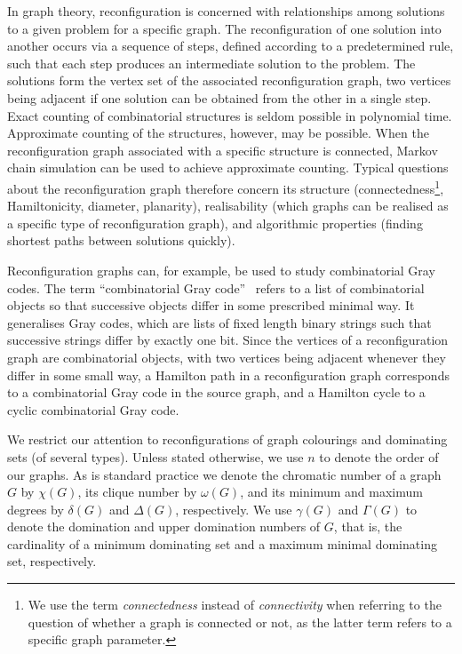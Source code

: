 \documentclass[12pt]{article}%
\begin{document}
\label{26CM-Sec_Intro} In graph theory, reconfiguration is concerned with
relationships among solutions to a given problem for a specific graph. The
reconfiguration of one solution into another occurs via a sequence of steps,
defined according to a predetermined rule, such that each step produces an
intermediate solution to the problem. The solutions form the vertex set of the
associated reconfiguration graph, two vertices being adjacent if one solution
can be obtained from the other in a single step. Exact counting of
combinatorial structures is seldom possible in polynomial time. Approximate
counting of the structures, however, may be possible. When the reconfiguration
graph associated with a specific structure is connected, Markov chain
simulation can be used to achieve approximate counting. Typical questions
about the reconfiguration graph therefore concern its structure
(connectedness\footnote{We use the term \emph{connectedness} instead of
\emph{connectivity} when referring to the question of whether a graph is
connected or not, as the latter term refers to a specific graph parameter.},
Hamiltonicity, diameter, planarity), realisability (which graphs can be
realised as a specific type of reconfiguration graph), and algorithmic
properties (finding shortest paths between solutions quickly).

Reconfiguration graphs can, for example, be used to study combinatorial Gray
codes. The term \textquotedblleft combinatorial Gray code\textquotedblright%
\ refers to a list of combinatorial objects so that successive objects differ
in some prescribed minimal way. It generalises Gray codes, which are lists of
fixed length binary strings such that successive strings differ by exactly one
bit. Since the vertices of a reconfiguration graph are combinatorial objects,
with two vertices being adjacent whenever they differ in some small way, a
Hamilton path in a reconfiguration graph corresponds to a combinatorial Gray
code in the source graph, and a Hamilton cycle to a cyclic combinatorial Gray code.

We restrict our attention to reconfigurations of graph colourings and
dominating sets (of several types). Unless stated otherwise, we use $n$ to
denote the order of our graphs. As is standard practice we denote the
chromatic number of a graph $G$ by $\chi(G)$, its clique number by $\omega
(G)$, and its minimum and maximum degrees by $\delta(G)$ and $\Delta(G)$,
respectively. We use $\gamma(G)$ and $\Gamma(G)$ to denote the domination and
upper domination numbers of $G$, that is, the cardinality of a minimum
dominating set and a maximum minimal dominating set, respectively.
\end{document}
